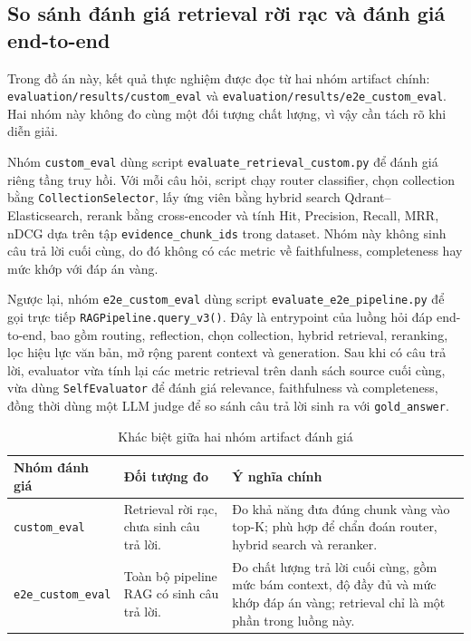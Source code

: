 \subsection{So sánh đánh giá retrieval rời rạc và đánh giá end-to-end}

Trong đồ án này, kết quả thực nghiệm được đọc từ hai nhóm artifact chính:
\texttt{evaluation/results/custom\_eval} và
\texttt{evaluation/results/e2e\_custom\_eval}. Hai nhóm này không đo cùng một
đối tượng chất lượng, vì vậy cần tách rõ khi diễn giải.

Nhóm \texttt{custom\_eval} dùng script
\texttt{evaluate\_retrieval\_custom.py} để đánh giá riêng tầng truy hồi. Với mỗi
câu hỏi, script chạy router classifier, chọn collection bằng
\texttt{CollectionSelector}, lấy ứng viên bằng hybrid search
Qdrant--Elasticsearch, rerank bằng cross-encoder và tính Hit, Precision,
Recall, MRR, nDCG dựa trên tập \texttt{evidence\_chunk\_ids} trong dataset.
Nhóm này không sinh câu trả lời cuối cùng, do đó không có các metric về
faithfulness, completeness hay mức khớp với đáp án vàng.

Ngược lại, nhóm \texttt{e2e\_custom\_eval} dùng script
\texttt{evaluate\_e2e\_pipeline.py} để gọi trực tiếp
\texttt{RAGPipeline.query\_v3()}. Đây là entrypoint của luồng hỏi đáp
end-to-end, bao gồm routing, reflection, chọn collection, hybrid retrieval,
reranking, lọc hiệu lực văn bản, mở rộng parent context và generation. Sau khi
có câu trả lời, evaluator vừa tính lại các metric retrieval trên danh sách
source cuối cùng, vừa dùng \texttt{SelfEvaluator} để đánh giá relevance,
faithfulness và completeness, đồng thời dùng một LLM judge để so sánh câu trả
lời sinh ra với \texttt{gold\_answer}.

\begin{table}[H]
\centering
\small
\begin{tabular}{|p{3.2cm}|p{4.8cm}|p{6.1cm}|}
\hline
\textbf{Nhóm đánh giá} & \textbf{Đối tượng đo} & \textbf{Ý nghĩa chính} \\
\hline
\texttt{custom\_eval} & Retrieval rời rạc, chưa sinh câu trả lời. & Đo khả năng đưa đúng chunk vàng vào top-K; phù hợp để chẩn đoán router, hybrid search và reranker. \\
\hline
\texttt{e2e\_custom\_eval} & Toàn bộ pipeline RAG có sinh câu trả lời. & Đo chất lượng trả lời cuối cùng, gồm mức bám context, độ đầy đủ và mức khớp đáp án vàng; retrieval chỉ là một phần trong luồng này. \\
\hline
\end{tabular}
\caption{Khác biệt giữa hai nhóm artifact đánh giá}
\end{table}

